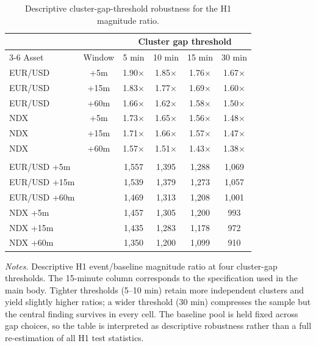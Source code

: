 \begin{table}[!htbp]
\centering
\caption{Descriptive cluster-gap-threshold robustness for the H1 magnitude ratio.}
\label{tab:cluster-gap-robustness}
\begin{threeparttable}
\small
\begin{tabular}{lccccc}
\toprule
 & & \multicolumn{4}{c}{Cluster gap threshold} \\
\cmidrule(lr){3-6}
Asset & Window & 5 min & 10 min & 15 min & 30 min \\
\midrule
EUR/USD & +5m & 1.90$\times$ & 1.85$\times$ & 1.76$\times$ & 1.67$\times$ \\
EUR/USD & +15m & 1.83$\times$ & 1.77$\times$ & 1.69$\times$ & 1.60$\times$ \\
EUR/USD & +60m & 1.66$\times$ & 1.62$\times$ & 1.58$\times$ & 1.50$\times$ \\
NDX & +5m & 1.73$\times$ & 1.65$\times$ & 1.56$\times$ & 1.48$\times$ \\
NDX & +15m & 1.71$\times$ & 1.66$\times$ & 1.57$\times$ & 1.47$\times$ \\
NDX & +60m & 1.57$\times$ & 1.51$\times$ & 1.43$\times$ & 1.38$\times$ \\
\addlinespace
\multicolumn{6}{l}{\textit{Number of clusters after dedupe}} \\
\quad EUR/USD +5m & & 1,557 & 1,395 & 1,288 & 1,069 \\
\quad EUR/USD +15m & & 1,539 & 1,379 & 1,273 & 1,057 \\
\quad EUR/USD +60m & & 1,469 & 1,313 & 1,208 & 1,001 \\
\quad NDX +5m & & 1,457 & 1,305 & 1,200 & 993 \\
\quad NDX +15m & & 1,435 & 1,283 & 1,178 & 972 \\
\quad NDX +60m & & 1,350 & 1,200 & 1,099 & 910 \\
\bottomrule
\end{tabular}
\begin{tablenotes}
\footnotesize
\item \textit{Notes.} Descriptive H1 event/baseline magnitude ratio
at four cluster-gap thresholds. The 15-minute column corresponds to
the specification used in the main body. Tighter thresholds
(5--10 min) retain more independent clusters and yield slightly
higher ratios; a wider threshold (30 min) compresses the sample but
the central finding survives in every cell. The baseline pool is held
fixed across gap choices, so the table is interpreted as descriptive
robustness rather than a full re-estimation of all H1 test statistics.
\end{tablenotes}
\end{threeparttable}
\end{table}
